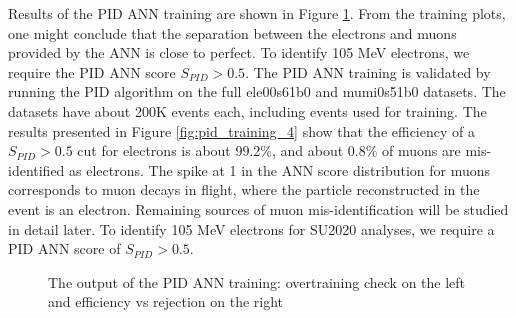 Results of the PID ANN training are shown in Figure \ref{fig:pid_training_3}. 
From the training plots, one might conclude that the separation between the
electrons and muons provided by the ANN is close to perfect. 
To identify 105 MeV electrons, we require the PID ANN score $S_{PID} > 0.5$.
The PID ANN training is validated by running the PID algorithm on the full ele00s61b0 and mumi0s51b0 datasets.
The datasets have about 200K events each, including events used for training.
The results presented in Figure \ref{fig:pid_training_4} show that the efficiency of a $S_{PID} > 0.5$ cut 
for electrons is about 99.2\%, and about 0.8\% of muons are mis-identified as electrons.
The spike at 1 in the ANN score distribution for muons corresponds to muon decays in flight,
where the particle reconstructed in the event is an electron.
Remaining sources of muon mis-identification will be studied in detail later.
To identify 105 MeV electrons for SU2020 analyses, we require a PID ANN score of $S_{PID} > 0.5$.


\begin{figure}[H]
\hspace{-0.6in}
  \caption{
    \label{fig:pid_training_3}
    The output of the PID ANN training: overtraining check on the left and efficiency vs rejection 
    on the right
  }
\end{figure}

